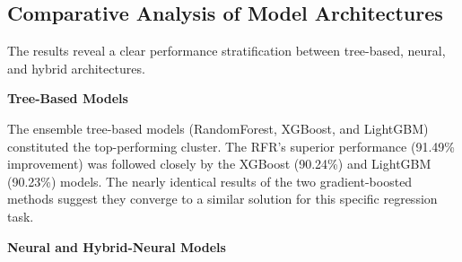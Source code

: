 \documentclass{isprs} %
\begin{document}

\subsection{Comparative Analysis of Model Architectures}\label{sec:5.2 Comparative Analysis of Model Architectures}
The results reveal a clear performance stratification between tree-based, neural, and hybrid architectures.

\textbf{Tree-Based Models}

The ensemble tree-based models (RandomForest, XGBoost, and LightGBM) constituted the top-performing cluster. The RFR's superior performance (91.49\% improvement) was followed closely by the XGBoost (90.24\%) and LightGBM (90.23\%) models. The nearly identical results of the two gradient-boosted methods suggest they converge to a similar solution for this specific regression task.

\textbf{Neural and Hybrid-Neural Models}
\end{document}
